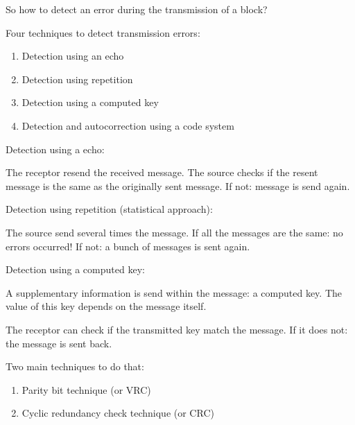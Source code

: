 \documentclass{beamer}[10pt, usepdftitle=false, handout]
\begin{document}
	\begin{frame}
	
	So how to detect an error during the transmission of a block?
	\vspace*{1em}
	
	Four techniques to detect transmission errors:	
	\vspace*{1em}
	
	\begin{enumerate}
	\item{Detection using an echo}
	\item{Detection using repetition}
	\item{Detection using a computed key}
	\item{Detection and autocorrection using a code system}
	\end{enumerate}
	
	\end{frame}

	\begin{frame}
	
	Detection using a echo:
	\vspace*{1em}
	
	The receptor resend the received message. The source checks if the resent message is the same as the originally sent message.
	If not: message is send again.
	\vspace*{1em}
	
	Detection using repetition (statistical approach):
	\vspace*{1em}
	
	The source send several times the message. If all the messages are the same: no errors occurred!
	If not: a bunch of messages is sent again. 
	
	\end{frame}

	\begin{frame}
	
	Detection using a computed key:
	\vspace*{1em}
	
	A supplementary information is send within the message: a computed key. The value of this key depends on the message itself. 
	\vspace*{0.5em}
	
	The receptor can check if the transmitted key match the message. If it does not: the message is sent back.
	\vspace*{1em}
	
	Two main techniques to do that:
	\vspace*{1em}
	
	\begin{enumerate}
	\item{Parity bit technique (or VRC)}
	\item{Cyclic redundancy check technique (or CRC)}
	\end{enumerate}		
	
	
	\end{frame}
\end{document}
